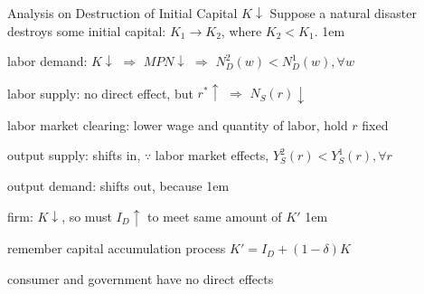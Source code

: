 \documentclass[11pt,aspectratio=43]{beamer}
\let\olditemize=\itemize
\let\endolditemize=\enditemize
\renewenvironment{itemize}{\olditemize \itemsep1em}{\endolditemize}
\theoremstyle{definition}
\begin{document}
\begin{frame}{Analysis on Destruction of Initial Capital $ K \downarrow  $}
\label{slide:Analysis_on_Destruction_of_Initial_Capital___K__downarrow___}
Suppose a natural disaster destroys some initial capital: $ K_{1} \rightarrow K_{2} $, where $ K_{2} < K_{1} $.
\begin{itemize}
    \item \alert{labor demand}: $ K \downarrow  $ $ \Rightarrow  $ $ MPN \downarrow  $ $ \Rightarrow  $ $ N_{D}^{2}( w ) < N_{D}^{1} ( w ), \forall w $
    \item \alert{labor supply}: no direct effect, but $ r^{*} \uparrow  $ $ \Rightarrow  $ $ N_{S} ( r ) \downarrow  $
    \item \alert{labor market clearing}: lower wage and quantity of labor, hold $ r $ fixed
    \item \alert{output supply}: shifts in, $ \because $ labor market effects, $ Y_{S}^{2}( r ) < Y_{S}^{1}( r ), \forall r $
    \item \alert{output demand}: shifts out, because
    \begin{itemize}
        \item firm: $ K \downarrow $, so must $ I_{D} \uparrow  $ to meet same amount of $ K' $
        \begin{itemize}
            \item remember capital accumulation process $K' = I_{D} + ( 1-\delta ) K$
        \end{itemize}
        \item consumer and government have no direct effects
    \end{itemize}
\end{itemize}
\end{frame}
\end{document}
